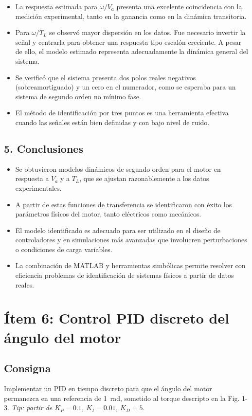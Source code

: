 \documentclass{article}
\begin{document}
\begin{itemize}
    \item La respuesta estimada para $\omega / V_a$ presenta una excelente coincidencia con la medición experimental, tanto en la ganancia como en la dinámica transitoria.
    \item Para $\omega / T_L$ se observó mayor dispersión en los datos. Fue necesario invertir la señal y centrarla para obtener una respuesta tipo escalón creciente. A pesar de ello, el modelo estimado representa adecuadamente la dinámica general del sistema.
    \item Se verificó que el sistema presenta dos polos reales negativos (sobreamortiguado) y un cero en el numerador, como se esperaba para un sistema de segundo orden no mínimo fase.
    \item El método de identificación por tres puntos es una herramienta efectiva cuando las señales están bien definidas y con bajo nivel de ruido.
\end{itemize}

\subsection{5. Conclusiones}

\begin{itemize}
    \item Se obtuvieron modelos dinámicos de segundo orden para el motor en respuesta a $V_a$ y a $T_L$, que se ajustan razonablemente a los datos experimentales.
    \item A partir de estas funciones de transferencia se identificaron con éxito los parámetros físicos del motor, tanto eléctricos como mecánicos.
    \item El modelo identificado es adecuado para ser utilizado en el diseño de controladores y en simulaciones más avanzadas que involucren perturbaciones o condiciones de carga variables.
    \item La combinación de MATLAB y herramientas simbólicas permite resolver con eficiencia problemas de identificación de sistemas físicos a partir de datos reales.
\end{itemize}

\section{Ítem 6: Control PID discreto del ángulo del motor}

\subsection*{Consigna}
Implementar un PID en tiempo discreto para que el ángulo del motor permanezca en una referencia de 1~rad, sometido al torque descripto en la Fig. 1-3. \emph{Tip: partir de $K_P = 0.1$, $K_I = 0.01$, $K_D = 5$}.
\end{document}
